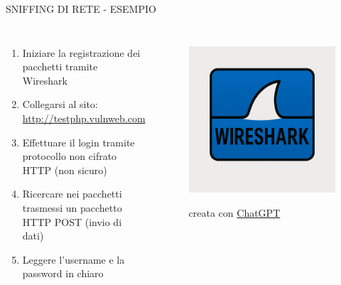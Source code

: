 \documentclass[aspectratio=1610, handout]{beamer}
\begin{document}
\begin{frame}{SNIFFING DI RETE - ESEMPIO}
    \begin{columns}
            \justifying
            \begin{enumerate}
                \item Iniziare la registrazione dei pacchetti tramite Wireshark
                \pause
                \item Collegarsi al sito: \href{http://testphp.vulnweb.com/login.php}{http://testphp.vulnweb.com}
                \pause
                \item Effettuare il login tramite protocollo non cifrato HTTP (non sicuro)
                \pause
                \item Ricercare nei pacchetti trasmessi un pacchetto HTTP POST (invio di dati)
                \pause
                \item Leggere l'username e la password in chiaro
            \end{enumerate}                        
            \begin{figure}
                \href{https://www.wireshark.org/}{\includegraphics[width=\linewidth]{img/wireshark.png}}
                \caption{{creata con \href{https://chatgpt.com/}{ChatGPT}}}
            \end{figure}
    \end{columns}
\end{frame}
\end{document}
